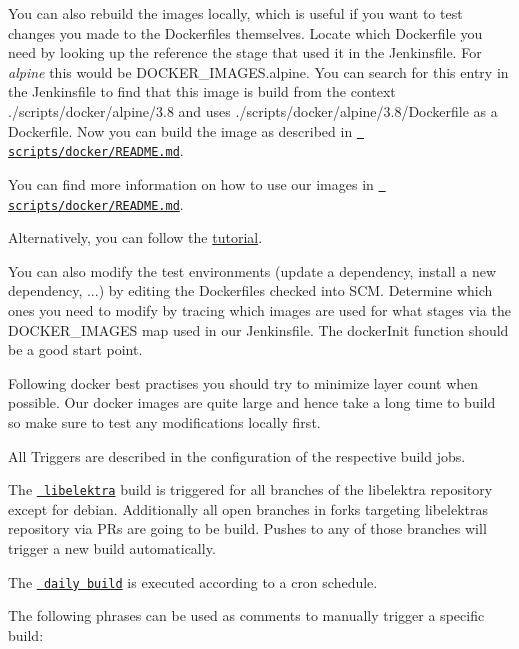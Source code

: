 You can also rebuild the images locally, which is useful if you want to test changes you made to the Dockerfiles themselves. Locate which Dockerfile you need by looking up the reference the stage that used it in the Jenkinsfile. For {\itshape alpine} this would be {\ttfamily D\+O\+C\+K\+E\+R\+\_\+\+I\+M\+A\+G\+E\+S.\+alpine}. You can search for this entry in the Jenkinsfile to find that this image is build from the context {\ttfamily ./scripts/docker/alpine/3.8} and uses {\ttfamily ./scripts/docker/alpine/3.8/\+Dockerfile} as a Dockerfile. Now you can build the image as described in \href{https://master.libelektra.org/scripts/docker/README.md\#building-images-locally}{\texttt{ scripts/docker/\+R\+E\+A\+D\+M\+E.\+md}}.

You can find more information on how to use our images in \href{https://master.libelektra.org/scripts/docker/README.md\#testing-elektra-via-docker-images}{\texttt{ scripts/docker/\+R\+E\+A\+D\+M\+E.\+md}}.

Alternatively, you can follow the \mbox{\hyperlink{doc_tutorials_run_all_tests_with_docker_md}{tutorial}}.

You can also modify the test environments (update a dependency, install a new dependency, ...) by editing the Dockerfiles checked into S\+CM. Determine which ones you need to modify by tracing which images are used for what stages via the {\ttfamily D\+O\+C\+K\+E\+R\+\_\+\+I\+M\+A\+G\+ES} map used in our Jenkinsfile. The {\ttfamily docker\+Init} function should be a good start point.

Following docker best practises you should try to minimize layer count when possible. Our docker images are quite large and hence take a long time to build so make sure to test any modifications locally first.

All Triggers are described in the configuration of the respective build jobs.

The \href{https://build.libelektra.org/job/libelektra/}{\texttt{ libelektra}} build is triggered for all branches of the libelektra repository except for {\ttfamily debian}. Additionally all open branches in forks targeting libelektra\textquotesingle{}s repository via P\+Rs are going to be build. Pushes to any of those branches will trigger a new build automatically.

The \href{https://build.libelektra.org/job/libelektra-daily/}{\texttt{ daily build}} is executed according to a cron schedule.

The following phrases can be used as comments to manually trigger a specific build\+:


